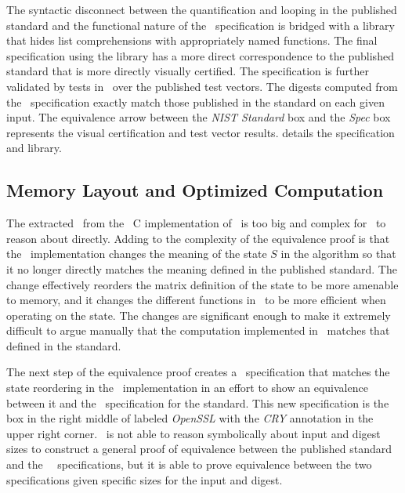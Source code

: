 The syntactic disconnect between the quantification and looping in the published standard and the functional nature of the \cryptol\ specification is bridged with a library that hides list comprehensions with appropriately named functions.
The final specification using the library has a more direct correspondence to the published standard that is more directly visually certified.
The specification is further validated by tests in \cryptol\ over the published test vectors.
The digests computed from the \cryptol\ specification exactly match those published in the standard on each given input.
The equivalence arrow between the \emph{NIST Standard} box and the \emph{Spec} box represents the visual certification and test vector results.
 details the specification and library.

\subsection{Memory Layout and Optimized Computation}

The extracted \sawcore\ from the \openssl\ C implementation of \shaThree\ is too big and complex for \saw\ to reason about directly.
Adding to the complexity of the equivalence proof is that the \openssl\ implementation changes the meaning of the state $S$ in the algorithm so that it no longer directly matches the meaning defined in the published standard.
The change effectively reorders the matrix definition of the state to be more amenable to memory, and it changes the different functions in \keccak\ to be more efficient when operating on the state.
The changes are significant enough to make it extremely difficult to argue manually that the computation implemented in \openssl\ matches that defined in the standard.

The next step of the equivalence proof creates a \cryptol\ specification that matches the state reordering in the \openssl\ implementation in an effort to show an equivalence between it and the \cryptol\ specification for the standard.
This new specification is the box in the right middle of  labeled \emph{OpenSSL} with the \emph{CRY} annotation in the upper right corner.
\saw\ is not able to reason symbolically about input and digest sizes to construct a general proof of equivalence between the published standard and the \openssl\ \cryptol\ specifications, but it is able to prove equivalence between the two specifications given specific sizes for the input and digest.

